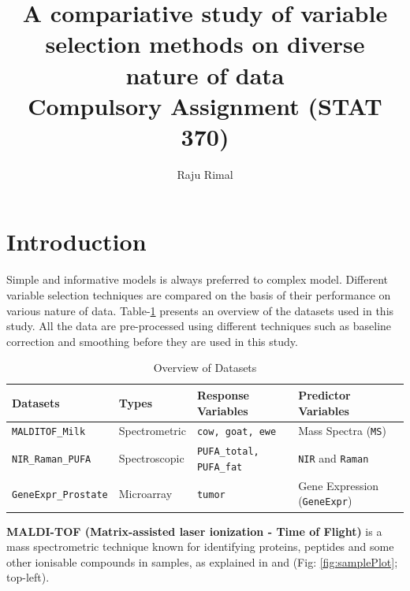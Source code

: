 \documentclass[10pt, a4paper]{article}\usepackage[]{graphicx}\usepackage[]{color}
\title{A compariative study of variable selection methods on diverse nature of data \\ \vspace{0.5cm}
\Large{Compulsory Assignment (STAT 370)}}
\author{Raju Rimal}
\begin{document}
\begin{titlepage}
\maketitle
\tableofcontents
\thispagestyle{empty}
\end{titlepage}

\section{Introduction}
Simple and informative models is always preferred to complex model. Different variable selection techniques are compared on the basis of their performance on various nature of data. Table-\ref{tbl:data-n-nature} presents an overview of the datasets used in this study. All the data are pre-processed using different techniques such as baseline correction and smoothing before they are used in this study.

\begin{table}[H]
\centering
\begingroup\small
\begin{tabularx}{0.9\textwidth}{lllX}
  \hline
Datasets & Types & Response Variables & Predictor Variables \\ 
  \hline
\texttt{MALDITOF\_Milk} & Spectrometric & \texttt{cow, goat, ewe} & Mass Spectra (\texttt{MS}) \\ 
  \texttt{NIR\_Raman\_PUFA} & Spectroscopic & \texttt{PUFA\_total, PUFA\_fat} & \texttt{NIR} and \texttt{Raman} \\ 
  \texttt{GeneExpr\_Prostate} & Microarray & \texttt{tumor} & Gene Expression (\texttt{GeneExpr}) \\ 
   \hline
\end{tabularx}
\endgroup
\caption{Overview of Datasets} 
\label{tbl:data-n-nature}
\end{table}


\textbf{MALDI-TOF (Matrix-assisted laser ionization - Time of Flight)} is a mass spectrometric technique known for identifying proteins, peptides and some other ionisable compounds in samples, as explained in \citet{liland2009quantitative} and \citet{} (Fig: \ref{fig:samplePlot}; top-left). 
\end{document}

